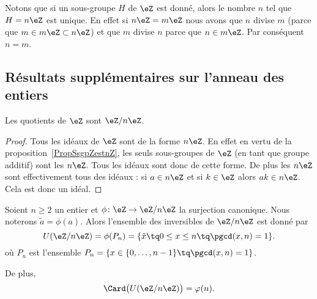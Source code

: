 Notons que si un sous-groupe \( H\) de \( \eZ\) est donné, alors le nombre \( n\) tel que \( H=n\eZ\) est unique. En effet si \( n\eZ=m\eZ\) nous avons que \( n\) divise \( m\) (parce que \( m\in m\eZ\subset n\eZ\)) et que \( m\) divise \( n\) parce que \( n\in m\eZ\). Par conséquent \( n=m\).

\subsection{Résultats supplémentaires sur l'anneau des entiers}

\begin{corollary}       \label{CORooLINXooBlUKPG}
    Les quotients de \( \eZ\) sont \( \eZ/n\eZ\).
\end{corollary}

\begin{proof}
    Tous les idéaux de \( \eZ\) sont de la forme \( n\eZ\). En effet en vertu de la proposition~\ref{PropSsgpZestnZ}, les seuls sous-groupes de \( \eZ\) (en tant que groupe additif) sont les \( n\eZ\). Tous les idéaux sont donc de cette forme. De plus les \( n\eZ\) sont effectivement tous des idéaux : si \( a\in n\eZ\) et si \( k\in \eZ\) alors \( ak\in n\eZ\). Cela est donc un idéal.
\end{proof}

\begin{proposition}     \label{PropZpintssiprempUzn}
    Soient \( n\geq 2\) un entier et \( \phi\colon \eZ\to \eZ/n\eZ\) la surjection canonique. Nous noterons \( \tilde a=\phi(a)\). Alors l'ensemble des inversibles de \( \eZ/n\eZ\) est donné par
    \begin{equation}
        U(\eZ/n\eZ)=\phi(P_n)=\{ \tilde x\tq 0\leq x\leq n\tq\pgcd(x,n)=1 \}.
    \end{equation}
    où \( P_n\) est l'ensemble $P_n=\{ x\in\{ 0,\ldots,n-1 \}\tq\pgcd(x,n)=1 \}$.

    De plus,
    \begin{equation}
        \Card\big( U(\eZ/n\eZ) \big)=\varphi(n).
    \end{equation}
\end{proposition}

